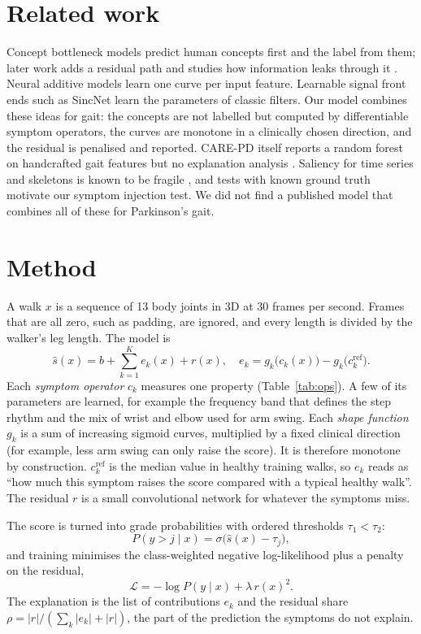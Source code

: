 \documentclass[10pt,twocolumn]{article}
\begin{document}
\section{Related work}
Concept bottleneck models \cite{koh2020} predict human concepts first and the label from them; later work adds
a residual path and studies how information leaks through it \cite{yuksekgonul2023,havasi2022}. Neural additive
models \cite{agarwal2021} learn one curve per input feature. Learnable signal front ends such as SincNet
\cite{ravanelli2018} learn the parameters of classic filters. Our model combines these ideas for gait: the
concepts are not labelled but computed by differentiable symptom operators, the curves are monotone in a
clinically chosen direction, and the residual is penalised and reported. CARE-PD itself reports a random forest
on handcrafted gait features but no explanation analysis \cite{carepd}. Saliency for time series and skeletons is
known to be fragile \cite{ismail2020,pellano2024}, and tests with known ground truth \cite{zhou2022} motivate our
symptom injection test. We did not find a published model that combines all of these for Parkinson's gait.

\section{Method}
A walk $x$ is a sequence of 13 body joints in 3D at 30 frames per second. Frames that are all zero, such as
padding, are ignored, and every length is divided by the walker's leg length. The model is
\begin{equation}
\hat{s}(x) = b + \sum_{k=1}^{K} e_k(x) + r(x), \quad e_k = g_k\big(c_k(x)\big) - g_k\big(c_k^{\mathrm{ref}}\big).
\label{eq:model}
\end{equation}
Each \emph{symptom operator} $c_k$ measures one property (Table~\ref{tab:ops}). A few of its parameters are
learned, for example the frequency band that defines the step rhythm and the mix of wrist and elbow used for arm
swing. Each \emph{shape function} $g_k$ is a sum of increasing sigmoid curves, multiplied by a fixed clinical
direction (for example, less arm swing can only raise the score). It is therefore monotone by construction.
$c_k^{\mathrm{ref}}$ is the median value in healthy training walks, so $e_k$ reads as ``how much this symptom
raises the score compared with a typical healthy walk''. The residual $r$ is a small convolutional network for
whatever the symptoms miss.

The score is turned into grade probabilities with ordered thresholds $\tau_1<\tau_2$:
\begin{equation}
P(y > j \mid x) = \sigma\big(\hat{s}(x) - \tau_j\big),
\end{equation}
and training minimises the class-weighted negative log-likelihood plus a penalty on the residual,
\begin{equation}
\mathcal{L} = -\log P(y \mid x) + \lambda\, r(x)^2 .
\end{equation}
The explanation is the list of contributions $e_k$ and the residual share
$\rho = |r| / (\sum_k |e_k| + |r|)$, the part of the prediction the symptoms do not explain.
\end{document}
